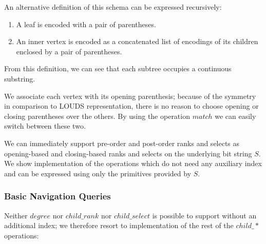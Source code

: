 An alternative definition of this schema can be expressed recursively:
\begin{enumerate}
	\item A leaf is encoded with a pair of parentheses.
	\item An inner vertex is encoded as a concatenated list of encodings of its children enclosed by a pair of parentheses.
\end{enumerate}
From this definition, we can see that each subtree occupies a continuous substring.

\bigskip

We associate each vertex with its opening parenthesis; because of the symmetry in comparison to LOUDS representation, there is no reason to choose opening or closing parentheses over the others.
By using the operation $match$ we can easily switch between these two.

We can immediately support pre-order and post-order ranks and selects as opening-based and closing-based ranks and selects on the underlying bit string $S$.
We show implementation of the operations which do not need any auxiliary index and can be expressed using only the primitives provided by $S$.


\begin{algorithmic}
	\State {}
\EndFunction
\end{algorithmic}

\begin{algorithmic}
	\State {} 
\EndFunction
\end{algorithmic}

\subsubsection{Basic Navigation Queries}

\begin{algorithmic}
		\State {}
	\Else
		\State {}
	\EndIf
\EndFunction
\end{algorithmic}

Neither $degree$ nor $child\_rank$ nor $child\_select$ is possible to support without an additional index; we therefore resort to implementation of the rest of the $child\_*$ operations:

